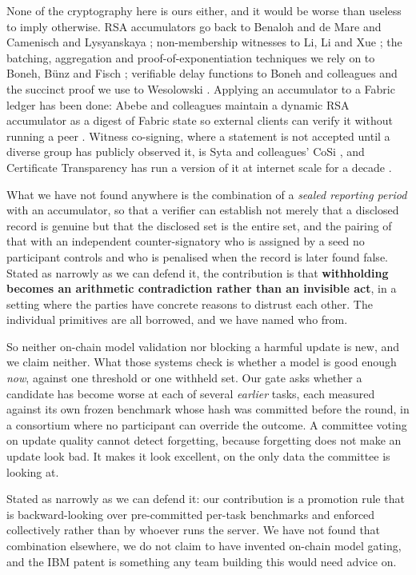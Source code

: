 \documentclass[11pt,a4paper]{article}
\begin{document}
None of the cryptography here is ours either, and it would be worse than useless
to imply otherwise. RSA accumulators go back to Benaloh and de Mare
\citep{benaloh1994accumulator} and Camenisch and Lysyanskaya
\citep{camenisch2002accumulator}; non-membership witnesses to Li, Li and Xue
\citep{li2007nonmembership}; the batching, aggregation and proof-of-exponentiation
techniques we rely on to Boneh, B\"{u}nz and Fisch \citep{boneh2019batching};
verifiable delay functions to Boneh and colleagues \citep{boneh2018vdf} and the
succinct proof we use to Wesolowski \citep{wesolowski2020vdf}. Applying an
accumulator to a Fabric ledger has been done: Abebe and colleagues maintain a
dynamic RSA accumulator as a digest of Fabric state so external clients can verify
it without running a peer \citep{abebe2021observation}. Witness co-signing, where a
statement is not accepted until a diverse group has publicly observed it, is
Syta and colleagues' CoSi \citep{syta2016cosi}, and Certificate Transparency has
run a version of it at internet scale for a decade \citep{laurie2014ct}.

What we have not found anywhere is the combination of a \emph{sealed reporting
period} with an accumulator, so that a verifier can establish not merely that a
disclosed record is genuine but that the disclosed set is the entire set, and
the pairing of that with an independent counter-signatory who is assigned by a
seed no participant controls and who is penalised when the record is later found
false. Stated as narrowly as we can defend it, the contribution is that
\textbf{withholding becomes an arithmetic contradiction rather than an invisible
act}, in a setting where the parties have concrete reasons to distrust each other.
The individual primitives are all borrowed, and we have named who from.

So neither on-chain model validation nor blocking a harmful update is new, and
we claim neither. What those systems check is whether a model is good enough
\emph{now}, against one threshold or one withheld set. Our gate asks whether a
candidate has become worse at each of several \emph{earlier} tasks, each
measured against its own frozen benchmark whose hash was committed before the
round, in a consortium where no participant can override the outcome. A
committee voting on update quality cannot detect forgetting, because forgetting
does not make an update look bad. It makes it look excellent, on the only data
the committee is looking at.

Stated as narrowly as we can defend it: our contribution is a promotion rule
that is backward-looking over pre-committed per-task benchmarks and enforced
collectively rather than by whoever runs the server. We have not found that
combination elsewhere, we do not claim to have invented on-chain model gating,
and the IBM patent is something any team building this would need advice on.
\end{document}
